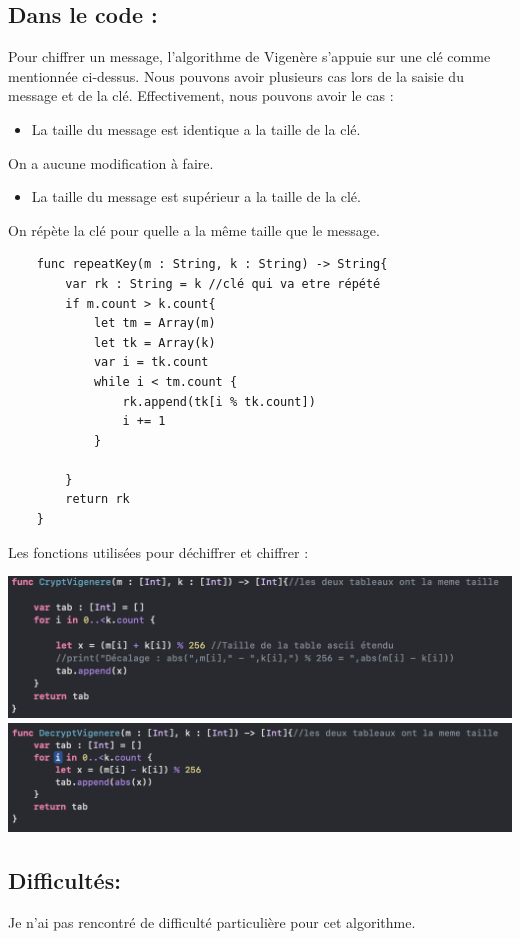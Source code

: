 \documentclass{article}
\begin{document}
\subsection{Dans le code : }
Pour chiffrer un message, l'algorithme de Vigenère s'appuie sur une clé comme mentionnée ci-dessus. Nous pouvons avoir plusieurs cas lors de la saisie du message et de la clé. \newline
Effectivement, nous pouvons avoir le cas : 
\begin{itemize}
\item La taille du message est identique a la taille de la clé. 
\end{itemize}
On a aucune modification à faire.
\begin{itemize}
\item La taille du message est supérieur a la taille de la clé. 
\end{itemize}
On répète la clé pour quelle a la même taille que le message.
\begin{verbatim}
    func repeatKey(m : String, k : String) -> String{
        var rk : String = k //clé qui va etre répété
        if m.count > k.count{
            let tm = Array(m)
            let tk = Array(k)
            var i = tk.count
            while i < tm.count {
                rk.append(tk[i % tk.count])
                i += 1
            }
            
        }
        return rk
    }
\end{verbatim}
\newpage
Les fonctions utilisées pour déchiffrer et chiffrer :
\begin{center}
  \includegraphics[scale=0.5]{Images/VigenereC.png}
  \includegraphics[scale=0.5]{Images/VigenereD.png}
\end{center}
\subsection{Difficultés:}
Je n'ai pas rencontré de difficulté particulière pour cet algorithme.
\newpage
\end{document}
